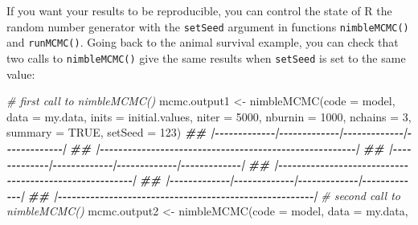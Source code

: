 \documentclass[
  12pt,
]{krantz}
\newenvironment{Shaded}{\begin{snugshade}}{\end{snugshade}}
\newcommand{\AttributeTok}[1]{\textcolor[rgb]{0.77,0.63,0.00}{#1}}
\newcommand{\CommentTok}[1]{\textcolor[rgb]{0.56,0.35,0.01}{\textit{#1}}}
\newcommand{\ConstantTok}[1]{\textcolor[rgb]{0.00,0.00,0.00}{#1}}
\newcommand{\DecValTok}[1]{\textcolor[rgb]{0.00,0.00,0.81}{#1}}
\newcommand{\DocumentationTok}[1]{\textcolor[rgb]{0.56,0.35,0.01}{\textbf{\textit{#1}}}}
\newcommand{\FunctionTok}[1]{\textcolor[rgb]{0.00,0.00,0.00}{#1}}
\newcommand{\NormalTok}[1]{#1}
\newcommand{\OtherTok}[1]{\textcolor[rgb]{0.56,0.35,0.01}{#1}}
\begin{document}
If you want your results to be reproducible, you can control the state of R the random number generator with the \texttt{setSeed} argument in functions \texttt{nimbleMCMC()} and \texttt{runMCMC()}. Going back to the animal survival example, you can check that two calls to \texttt{nimbleMCMC()} give the same results when \texttt{setSeed} is set to the same value:

\begin{Shaded}
\begin{Highlighting}[]
\CommentTok{\# first call to nimbleMCMC()}
\NormalTok{mcmc.output1 }\OtherTok{\textless{}{-}} \FunctionTok{nimbleMCMC}\NormalTok{(}\AttributeTok{code =}\NormalTok{ model,}
                           \AttributeTok{data =}\NormalTok{ my.data,}
                           \AttributeTok{inits =}\NormalTok{ initial.values,}
                           \AttributeTok{niter =} \DecValTok{5000}\NormalTok{,}
                           \AttributeTok{nburnin =} \DecValTok{1000}\NormalTok{,}
                           \AttributeTok{nchains =} \DecValTok{3}\NormalTok{,}
                           \AttributeTok{summary =} \ConstantTok{TRUE}\NormalTok{,}
                           \AttributeTok{setSeed =} \DecValTok{123}\NormalTok{)}
\DocumentationTok{\#\# |{-}{-}{-}{-}{-}{-}{-}{-}{-}{-}{-}{-}{-}|{-}{-}{-}{-}{-}{-}{-}{-}{-}{-}{-}{-}{-}|{-}{-}{-}{-}{-}{-}{-}{-}{-}{-}{-}{-}{-}|{-}{-}{-}{-}{-}{-}{-}{-}{-}{-}{-}{-}{-}|}
\DocumentationTok{\#\# |{-}{-}{-}{-}{-}{-}{-}{-}{-}{-}{-}{-}{-}{-}{-}{-}{-}{-}{-}{-}{-}{-}{-}{-}{-}{-}{-}{-}{-}{-}{-}{-}{-}{-}{-}{-}{-}{-}{-}{-}{-}{-}{-}{-}{-}{-}{-}{-}{-}{-}{-}{-}{-}{-}{-}|}
\DocumentationTok{\#\# |{-}{-}{-}{-}{-}{-}{-}{-}{-}{-}{-}{-}{-}|{-}{-}{-}{-}{-}{-}{-}{-}{-}{-}{-}{-}{-}|{-}{-}{-}{-}{-}{-}{-}{-}{-}{-}{-}{-}{-}|{-}{-}{-}{-}{-}{-}{-}{-}{-}{-}{-}{-}{-}|}
\DocumentationTok{\#\# |{-}{-}{-}{-}{-}{-}{-}{-}{-}{-}{-}{-}{-}{-}{-}{-}{-}{-}{-}{-}{-}{-}{-}{-}{-}{-}{-}{-}{-}{-}{-}{-}{-}{-}{-}{-}{-}{-}{-}{-}{-}{-}{-}{-}{-}{-}{-}{-}{-}{-}{-}{-}{-}{-}{-}|}
\DocumentationTok{\#\# |{-}{-}{-}{-}{-}{-}{-}{-}{-}{-}{-}{-}{-}|{-}{-}{-}{-}{-}{-}{-}{-}{-}{-}{-}{-}{-}|{-}{-}{-}{-}{-}{-}{-}{-}{-}{-}{-}{-}{-}|{-}{-}{-}{-}{-}{-}{-}{-}{-}{-}{-}{-}{-}|}
\DocumentationTok{\#\# |{-}{-}{-}{-}{-}{-}{-}{-}{-}{-}{-}{-}{-}{-}{-}{-}{-}{-}{-}{-}{-}{-}{-}{-}{-}{-}{-}{-}{-}{-}{-}{-}{-}{-}{-}{-}{-}{-}{-}{-}{-}{-}{-}{-}{-}{-}{-}{-}{-}{-}{-}{-}{-}{-}{-}|}
\CommentTok{\# second call to nimbleMCMC()}
\NormalTok{mcmc.output2 }\OtherTok{\textless{}{-}} \FunctionTok{nimbleMCMC}\NormalTok{(}\AttributeTok{code =}\NormalTok{ model,}
                           \AttributeTok{data =}\NormalTok{ my.data,}

\end{Highlighting}
\end{Shaded}
\end{document}
